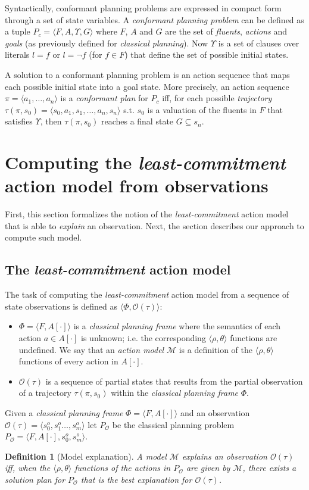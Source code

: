 \documentclass{article}
\newcommand{\tup}[1]{{\langle #1 \rangle}}
\newtheorem{definition}[theorem]{Definition}
\begin{document}
Syntactically, conformant planning problems are expressed in compact form through a set of state variables. A {\em conformant planning problem} can be defined as a tuple $P_c=\tup{F,A,\Upsilon,G}$ where $F$, $A$ and $G$ are the set of {\em fluents}, {\em actions} and {\em goals} (as previously defined for {\em classical planning}). Now $\Upsilon$ is a set of clauses over literals $l=f$ or $l=\neg f$ (for $f\in F$) that define the set of possible initial states. 

A solution to a conformant planning problem is an action sequence that maps each possible initial state into a goal state. More precisely, an action sequence $\pi=\tup{a_1, \ldots, a_n}$ is a {\em conformant plan} for $P_c$ iff, for each possible {\em trajectory} $\tau(\pi,s_0)=\tup{s_0, a_1, s_1, \ldots, a_n, s_n}$ s.t. $s_0$ is a valuation of the fluents in $F$ that satisfies $\Upsilon$, then $\tau(\pi,s_0)$ reaches a final state $G \subseteq s_n$. 


\section{Computing the {\em least-commitment} action model from observations}
First, this section formalizes the notion of the {\em least-commitment} action model that is able to {\em explain} an observation. Next, the section describes our approach to compute such model. 

\subsection{The {\em least-commitment} action model}
The task of computing the {\em least-commitment} action model from a sequence of state observations is defined as $\tup{\Phi,\mathcal{O}(\tau)}$:
\begin{itemize}
\item $\Phi=\tup{F,A[\cdot]}$ is a {\em classical planning frame} where the semantics of each action $a\in A[\cdot]$ is unknown; i.e. the corresponding $\tup{\rho,\theta}$ functions are undefined. We say that an {\em action model} $\mathcal{M}$ is a definition of the $\tup{\rho,\theta}$ functions of every action in $A[\cdot]$. 
\item $\mathcal{O}(\tau)$ is a sequence of partial states that results from the partial observation of a trajectory $\tau(\pi,s_0)$ within the {\em classical planning frame} $\Phi$.
\end{itemize}

Given a {\em classical planning frame} $\Phi=\tup{F,A[\cdot]}$ and an observation $\mathcal{O}(\tau)=\tup{s_0^o,s_1^o \ldots , s_m^o}$ let $P_\mathcal{O}$ be the classical planning problem $P_\mathcal{O}=\tup{F,A[\cdot],s_0^o,s_m^o}$.
\begin{definition}[Model explanation]
A model $\mathcal{M}$ {\em explains} an observation $\mathcal{O}(\tau)$ iff, when the $\tup{\rho,\theta}$ functions of the actions in $P_\mathcal{O}$ are given by $\mathcal{M}$, there exists a solution plan for $P_\mathcal{O}$ that is the {\em best explanation} for $\mathcal{O}(\tau)$.  
\end{definition}
\end{document}
